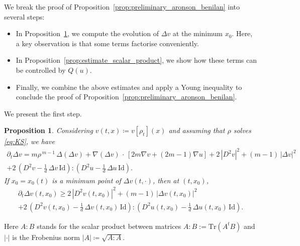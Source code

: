 \documentclass[11pt,a4paper]{article}
\numberwithin{equation}{section}
\theoremstyle{plain}
\newtheorem{proposition}[theorem]{Proposition}
\theoremstyle{remark}
\newcommand {\f}{\frac}
\begin{document}
 We break the proof of Proposition~\ref{prop:preliminary_aronson_benilan} into several steps:
\begin{itemize}
    \item In Proposition~\ref{lem:max_laplace_v}, we compute the evolution of $\Delta v$ at the minimum $x_0$. Here, a key observation is that some terms factorise conveniently.
    \item In Proposition~\ref{prop:estimate_scalar_product}, we show how these terms can be controlled by $Q(u)$.
    \item Finally, we combine the above estimates and apply a Young inequality to conclude the proof of Proposition~\ref{prop:preliminary_aronson_benilan}.
\end{itemize}
We present the first step.


\begin{proposition}\label{lem:max_laplace_v}
Considering $v(t,x) \coloneqq v[\rho_t](x)$ and assuming that $\rho$ solves \eqref{eq:KS}, we have 
\begin{multline*}
\partial_t \Delta v 
  =  
  m\rho^{\,m-1}\,\Delta(\Delta v) 
    +  \nabla (\Delta v)\, \cdot \, \left[2m\nabla v + (2m-1)\nabla u\right]
    +2\,\left|D^2 v\right|^2
  + (m-1)\,\left|\Delta v\right|^2\\ 
+2\,\left(D^2 v  -  \f1d\,\Delta v\,\mathrm{Id}\right)
  :\left(D^2 u -  \f1d\,\Delta u\,\mathrm{Id}\right).
\end{multline*}
If $x_0=x_{0}(t)$ is a minimum point of $\Delta v(t,\cdot)$, then at $(t,x_0)$, 
\begin{multline*}
\partial_t  \Delta v(t,x_0)
  \ge 
2\,\left|D^2 v(t,x_0)\right|^2
  + (m-1)\,\left|\Delta v(t,x_0)\right|^2\\
  + 
2\,\left(D^2 v(t,x_0)  -  \f1d\,\Delta v(t,x_0)\,\mathrm{Id}\right)
  :\left(D^2 u(t,x_0)  -  \f1d\,\Delta u(t,x_0)\,\mathrm{Id}\right).
\end{multline*}
\end{proposition}
Here $A:B$ stands for the scalar product between matrices $A:B:=\mathrm{Tr}(A^tB)$ and $|\cdot|$ is the Frobenius norm $|A|\coloneqq\sqrt{A:A}$.
\end{document}

